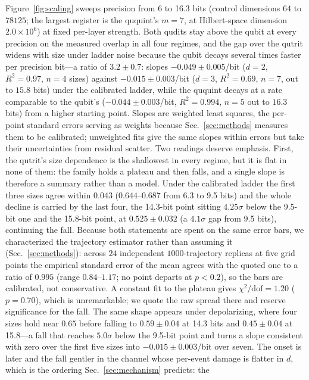 \documentclass[aps,pra,reprint,superscriptaddress,nofootinbib,floatfix]{revtex4-2}
\begin{document}
Figure~\ref{fig:scaling} sweeps precision from 6 to 16.3 bits (control
dimensions $64$ to $78125$; the largest register is the ququint's
$m=7$, at Hilbert-space dimension $2.0\times10^{6}$) at fixed
per-layer strength. Both qudits stay above the
qubit at every precision on the measured overlap in all four regimes,
and the gap over the qutrit widens with size under ladder noise
because the qubit decays several times faster per precision bit---a
ratio of $3.2\pm0.7$: slopes $-0.049\pm0.005$/bit ($d{=}2$,
$R^2=0.97$, $n=4$ sizes) against
$-0.015\pm0.003$/bit ($d{=}3$, $R^2=0.69$, $n=7$, out to $15.8$
bits) under the calibrated
ladder, while the ququint decays at a rate comparable to the qubit's
($-0.044\pm0.003$/bit, $R^2=0.994$, $n=5$ out to $16.3$ bits) from a
higher starting
point. Slopes are weighted least squares, the per-point standard
errors serving as weights because Sec.~\ref{sec:methods} measures them
to be calibrated; unweighted fits give the same slopes within errors
but take their uncertainties from residual scatter. Two readings deserve emphasis. First, the qutrit's size
dependence is the shallowest in every regime, but it is flat in none of
them: the family holds a plateau and then falls, and a single slope is
therefore a summary rather than a model. Under the calibrated ladder the
first three sizes agree within $0.043$ ($0.644$--$0.687$
from 6.3 to 9.5 bits) and the whole
decline is carried by the last
four, the 14.3-bit point sitting $4.25\sigma$ below the 9.5-bit one
and the 15.8-bit point, at $0.525\pm0.032$ (a $4.1\sigma$ gap from
9.5 bits), continuing the fall.
Because both statements are spent on the same error bars, we
characterized the trajectory estimator rather than assuming it
(Sec.~\ref{sec:methods}): across $24$ independent $1000$-trajectory
replicas at five grid points the empirical standard error of the mean
agrees with the quoted one to a ratio of $0.995$ (range
$0.84$--$1.17$; no point departs at $p<0.2$), so the bars are
calibrated, not conservative. A constant fit to the plateau gives
$\chi^2/\mathrm{dof}=1.20$ ($p=0.70$), which is unremarkable; we
quote the raw spread there and reserve significance for the fall.
The same shape appears under depolarizing, where four sizes hold near
$0.65$ before falling to $0.59\pm0.04$ at 14.3 bits and
$0.45\pm0.04$ at 15.8---a fall that reaches $5.0\sigma$ below the
9.5-bit point and turns a slope consistent with zero over the first
five sizes into $-0.015\pm0.003$/bit over seven. The onset is later and
the fall gentler in the channel whose per-event damage is flatter in
$d$, which is the ordering Sec.~\ref{sec:mechanism} predicts: the
\end{document}
